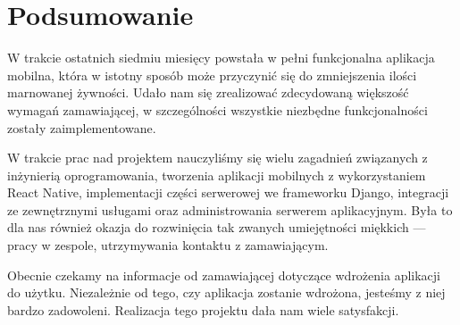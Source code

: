 \documentclass[licencjacka]{pracamgr}
\begin{document}
\chapter{Podsumowanie}\label{r:pods}
W trakcie ostatnich siedmiu miesięcy powstała w pełni funkcjonalna aplikacja mobilna, która w istotny sposób może przyczynić się do zmniejszenia ilości marnowanej żywności. Udało nam się zrealizować zdecydowaną większość wymagań zamawiającej, w szczególności wszystkie niezbędne funkcjonalności zostały zaimplementowane.

W trakcie prac nad projektem nauczyliśmy się wielu zagadnień związanych z inżynierią oprogramowania, tworzenia aplikacji mobilnych z wykorzystaniem React Native, implementacji części serwerowej we frameworku Django, integracji ze zewnętrznymi usługami oraz administrowania serwerem aplikacyjnym. Była to dla nas również okazja do rozwinięcia tak zwanych umiejętności miękkich --- pracy w zespole, utrzymywania kontaktu z zamawiającym.

Obecnie czekamy na informacje od zamawiającej dotyczące wdrożenia aplikacji do użytku. Niezależnie od tego, czy aplikacja zostanie wdrożona, jesteśmy z niej bardzo zadowoleni. Realizacja tego projektu dała nam wiele satysfakcji.
\end{document}
